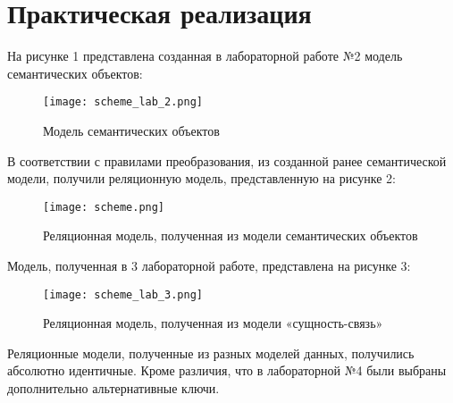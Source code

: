 \documentclass[a4paper, 14pt]{extarticle}
\begin{document}
\par

\section{Практическая реализация}\label{Sect::task}
    На рисунке 1 представлена созданная в лабораторной работе №2 модель семантических объектов:

\begin{figure}[!htb]
	\centering
	\texttt{[image: scheme\_lab\_2.png]}
\caption{Модель семантических объектов}
\label{fig:scheme}
\end{figure}

    В соответствии с правилами преобразования, из созданной ранее семантической модели, получили реляционную модель, представленную на рисунке 2:

\begin{figure}[!htb]
	\centering
	\texttt{[image: scheme.png]}
\caption{Реляционная модель, полученная из модели семантических объектов}
\label{fig:scheme}
\end{figure}

    Модель, полученная в 3 лабораторной работе, представлена на рисунке 3:

\begin{figure}[!htb]
	\centering
	\texttt{[image: scheme\_lab\_3.png]}
\caption{Реляционная модель, полученная из модели «сущность-связь»}
\label{fig:scheme}
\end{figure}

    Реляционные модели, полученные из разных моделей данных, получились абсолютно идентичные. Кроме различия, что в лабораторной №4 были выбраны дополнительно альтернативные ключи.
\end{document}
